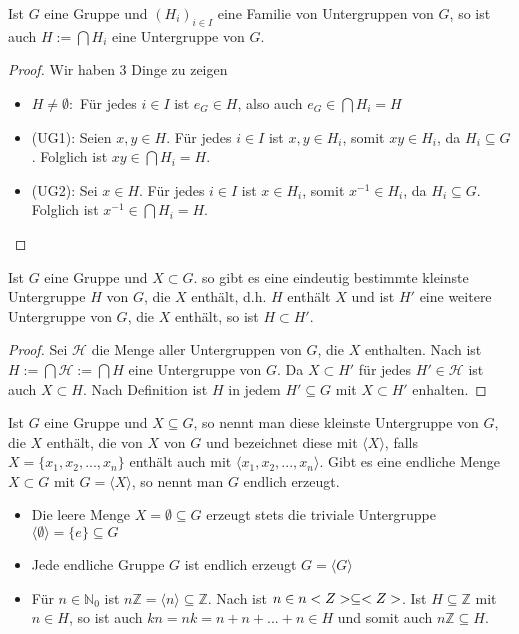 \begin{lemma}
	Ist $G$ eine Gruppe und $(H_i)_{i \in I}$ eine Familie von Untergruppen von $G$,
	so ist auch $H := \bigcap H_i$ eine Untergruppe von $G$.
\end{lemma}
\begin{proof}
	Wir haben 3 Dinge zu zeigen
	\begin{itemize}
		\item $H \neq \emptyset:$ Für jedes $i \in I$ ist $e_G \in H$, also auch $e_G \in \bigcap
		H_i =H$
		\item (UG1): Seien $x,y \in H$. Für jedes $i \in I$ ist $x,y \in H_i$, somit $xy \in H_i$,
		da $H_i \subseteq G$. Folglich ist $xy \in \bigcap H_i=H$.
		\item (UG2): Sei $x \in H$. Für jedes $i \in I$ ist $x \in H_i$, somit $x^{-1} \in H_i$,
		da $H_i \subseteq G$. Folglich ist $x^{-1} \in \bigcap H_i=H$.
	\end{itemize}
\end{proof}

\begin{proposition}
	Ist $G$ eine Gruppe und $X \subset G$. so gibt es eine eindeutig bestimmte
	kleinste Untergruppe $H$ von $G$, die $X$ enthält, d.h. $H$ enthält $X$ und ist $H'$
	eine weitere Untergruppe von $G$, die $X$ enthält, so ist $H \subset H'$.
\end{proposition}
\begin{proof}
	Sei $\mathcal{H}$ die Menge aller Untergruppen von $G$, die $X$ enthalten. Nach 
	ist $H:=
	\bigcap \mathcal{H} := \bigcap H$ eine Untergruppe von $G$. Da $X \subset H'$ für jedes $H' \in 
	\mathcal H$ ist auch $X \subset H$. Nach Definition ist $H$ in jedem $H' \subseteq G$ mit $X \subset H'$
	enhalten.
\end{proof}

\begin{definition}
	Ist $G$ eine Gruppe und $X \subseteq G$, so nennt man diese
	kleinste Untergruppe von $G$, die $X$ enthält, die von $X$  von $G$ und
	bezeichnet diese mit $\langle X\rangle$, falls $X = \{x_1,x_2,...,x_n\}$ enthält auch mit $\langle x_1,x_2,
	...,x_n\rangle$. Gibt es eine endliche Menge $X \subset G$ mit $G=\langle X\rangle$, so nennt man $G$ endlich
	erzeugt.
\end{definition}

\begin{example}
	\begin{itemize}
		\item Die leere Menge $X=\emptyset \subseteq G$ erzeugt stets die triviale Untergruppe $\langle \emptyset\rangle
		=\{e\} \subseteq G$
		\item Jede endliche Gruppe $G$ ist endlich erzeugt $G=\langle G\rangle$
		\item Für $n \in \mathbb{N}_0$ ist $n\mathbb{Z}=\langle n\rangle \subseteq \mathbb{Z}$. Nach  ist $n\in n<Z>\subseteq<Z>$. Ist $H \subseteq \mathbb{Z}$
		mit $n \in H$, so ist auch $kn=nk=n+n+...+n \in H$ und somit auch $n\mathbb{Z} \subseteq H$.
	\end{itemize}
\end{example}